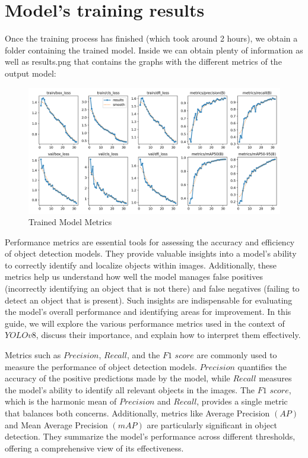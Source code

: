 \documentclass[../main]{subfiles}
\begin{document}
\section{Model's training results}
Once the training process has finished (which took around 2 hours), we obtain a folder containing the trained model. Inside we can obtain plenty of information as well as results.png that contains the graphs with the different metrics of the output model:
\begin{figure}[H]
     \centering
     \includegraphics[width=1\textwidth]{./figures/results}
     \caption{Trained Model Metrics}
     \label{fig:red}
\end{figure}
Performance metrics are essential tools for assessing the accuracy and efficiency of object detection models. They provide valuable insights into a model's ability to correctly identify and localize objects within images. Additionally, these metrics help us understand how well the model manages false positives (incorrectly identifying an object that is not there) and false negatives (failing to detect an object that is present). Such insights are indispensable for evaluating the model's overall performance and identifying areas for improvement. In this guide, we will explore the various performance metrics used in the context of $YOLOv8$, discuss their importance, and explain how to interpret them effectively.

Metrics such as $Precision$, $Recall$, and the $F1$ $score$ are commonly used to measure the performance of object detection models. $Precision$ quantifies the accuracy of the positive predictions made by the model, while $Recall$ measures the model's ability to identify all relevant objects in the images. The $F1$ $score$, which is the harmonic mean of $Precision$ and $Recall$, provides a single metric that balances both concerns. Additionally, metrics like Average Precision $(AP)$ and Mean Average Precision $(mAP)$ are particularly significant in object detection. They summarize the model's performance across different thresholds, offering a comprehensive view of its effectiveness.
\end{document}
